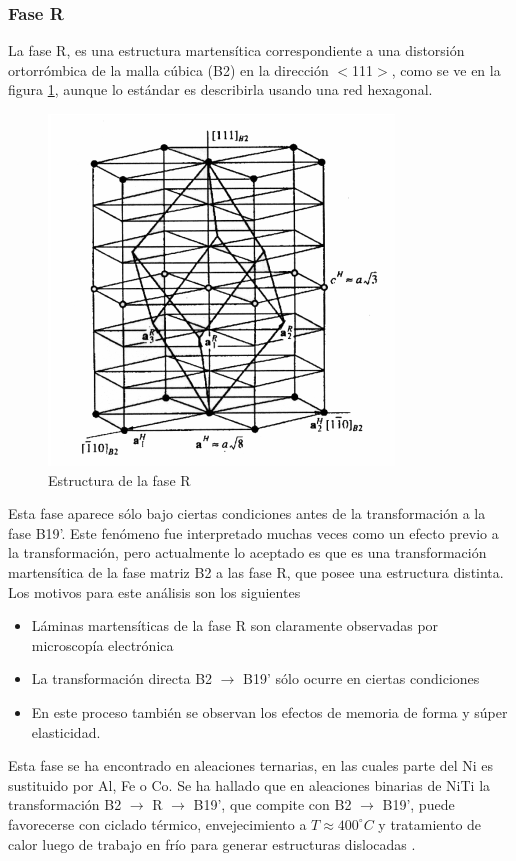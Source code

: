 \documentclass[12pt]{article}
\theoremstyle{definition}
\theoremstyle{remark}
\begin{document}
\subsubsection{Fase R}
La fase R, es una estructura martensítica correspondiente a una distorsión
ortorrómbica de la malla cúbica (B2) en la dirección $<$111$>$, como se ve en la figura \ref{RPhase}, aunque lo estándar es describirla usando una red hexagonal.
\begin{figure}[H]
	\centering	
	\includegraphics[scale=0.5]{img/RPhase.png}
	\caption{Estructura de la fase R}
	\label{RPhase}
\end{figure}

Esta fase aparece sólo bajo ciertas condiciones antes de la transformación a la fase B19'. Este fenómeno fue interpretado muchas veces como un efecto previo a la transformación, pero actualmente lo aceptado es que es una transformación martensítica de la fase matriz B2 a las fase R, que posee una estructura distinta. Los motivos para este análisis son los siguientes
\begin{itemize}
	\item Láminas martensíticas de la fase R son claramente observadas por microscopía electrónica
	\item La transformación directa B2 $\rightarrow$ B19' sólo ocurre en ciertas condiciones
	\item En este proceso también se observan los efectos de memoria de forma y súper elasticidad.
\end{itemize}


Esta fase se ha encontrado en aleaciones ternarias, en las cuales parte del Ni es sustituido por Al, Fe o Co. Se ha hallado que en  aleaciones binarias de NiTi la transformación B2 $\rightarrow$ R $\rightarrow$ B19', que compite con B2 $\rightarrow$ B19', puede favorecerse con ciclado térmico, envejecimiento a $T \approx 400 ^\circ C$ y tratamiento de calor luego de trabajo en frío para generar estructuras dislocadas \cite{Santamarta}\cite{ThinFilm}\cite{TiNi}. 
\end{document}
